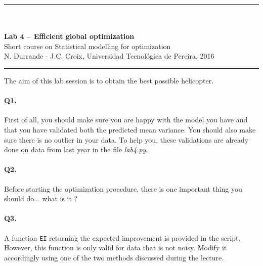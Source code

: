 \documentclass[12pt]{scrartcl}
\begin{document}
\begin{center}
	\rule{\textwidth}{1pt}
	\\ \ \\
	{\LARGE \textbf{Lab 4 -- Efficient global optimization}}\\ 
	\vspace{3mm}
	{\large Short course on Statistical modelling for optimization\\ \vspace{3mm}}
	{\normalsize N. Durrande - J.C. Croix, Universidad Tecnol\'ogica de Pereira, 2016}\\ 
	\vspace{3mm}
	\rule{\textwidth}{1pt}
	\vspace{5mm}
\end{center}
The aim of this lab session is to obtain the best possible helicopter.



\paragraph{Q1.} First of all, you should make sure you are happy with the model you have and that you have validated both the predicted mean variance. You should also make sure there is no outlier in your data. To help you, these validations are already done on data from last year in the file \emph{lab4.py}.

\paragraph{Q2.} Before starting the optimization procedure, there is one important thing you should do... what is it ?

\paragraph{Q3.} A function \texttt{EI} returning the expected improvement is provided in the script. However, this function is only valid for data that is not noisy. Modify it accordingly using one of the two methods discussed during the lecture.
\end{document}
